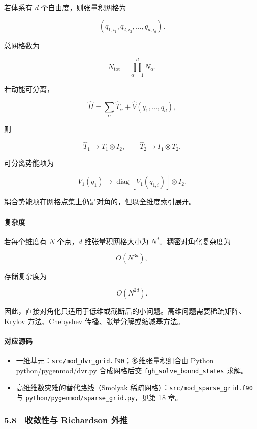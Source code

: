 \documentclass[
]{ctexbook}
\providecommand{\tightlist}{%
  \setlength{\itemsep}{0pt}\setlength{\parskip}{0pt}}
\begin{document}
若体系有 \(d\) 个自由度，则张量积网格为

\[
(q_{1,i_1},q_{2,i_2},\ldots,q_{d,i_d}).
\]

总网格数为

\[
N_{\mathrm{tot}}=\prod_{\alpha=1}^{d}N_\alpha.
\]

若动能可分离，

\[
\hat H=\sum_{\alpha}\hat T_\alpha+\hat V(q_1,\ldots,q_d),
\]

则

\[
\hat T_1\rightarrow T_1\otimes I_2,
\qquad
\hat T_2\rightarrow I_1\otimes T_2.
\]

可分离势能项为

\[
V_1(q_1)
\rightarrow
\operatorname{diag}[V_1(q_{1,i})]\otimes I_2.
\]

耦合势能项在网格点集上仍是对角的，但以全维度索引展开。

\hypertarget{ux590dux6742ux5ea6}{%
\paragraph{复杂度}\label{ux590dux6742ux5ea6}}

若每个维度有 \(N\) 个点，\(d\) 维张量积网格大小为
\(N^d\)。稠密对角化复杂度为

\[
O(N^{3d}),
\]

存储复杂度为

\[
O(N^{2d}).
\]

因此，直接对角化只适用于低维或截断后的小问题。高维问题需要稀疏矩阵、Krylov
方法、Chebyshev 传播、张量分解或缩减基方法。

\hypertarget{ux5bf9ux5e94ux6e90ux7801-11}{%
\paragraph{对应源码}\label{ux5bf9ux5e94ux6e90ux7801-11}}

\begin{itemize}
\tightlist
\item
  一维基元：\texttt{src/mod\_dvr\_grid.f90}；多维张量积组合由 Python
  \href{https://github.com/l1Ha/QuantumGeneralModule/blob/main/python/pygenmod/dvr.py}{python/pygenmod/dvr.py}
  合成网格后交 \texttt{fgh\_solve\_bound\_states} 求解。
\item
  高维维数灾难的替代路线（Smolyak
  稀疏网格）：\texttt{src/mod\_sparse\_grid.f90} 与
  \texttt{python/pygenmod/sparse\_grid.py}，见第 18 章。
\end{itemize}

\hypertarget{ux6536ux655bux6027ux4e0e-richardson-ux5916ux63a8}{%
\subsubsection{5.8　收敛性与 Richardson
外推}\label{ux6536ux655bux6027ux4e0e-richardson-ux5916ux63a8}}
\end{document}
